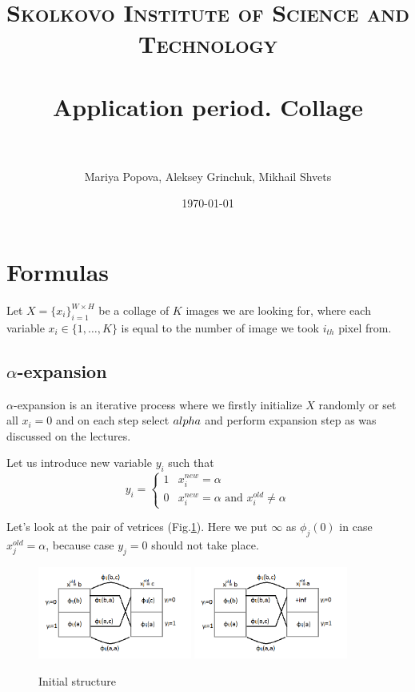 \documentclass[paper=a4, fontsize=11pt]{scrartcl} %
\title{	
\normalfont \normalsize
\textsc{Skolkovo Institute of Science and Technology} \\ [25pt] %
\horrule{0.5pt} \\[0.4cm] %
\huge Application period. Collage \\ %
\horrule{0.5pt} \\[0.5cm] %
}
\author{Mariya Popova, Aleksey Grinchuk, Mikhail Shvets} %
\date{\normalsize\today} %
\numberwithin{equation}{section} %
\numberwithin{figure}{section} %
\numberwithin{table}{section} %
\begin{document}
\maketitle %


\section{Formulas}

Let $X=\{x_i\}_{i=1}^{W \times H}$ be a collage of $K$ images we are looking for, where each variable $x_i \in \{1,\dots,K\}$ is equal to the number of image we took $i_{th}$ pixel from.

\subsection*{$\alpha$-expansion}

$\alpha$-expansion is an iterative process where we firstly initialize $X$ randomly or set all $x_i = 0$ and on each step select $\\alpha$ and perform expansion step as was discussed on the lectures.

Let us introduce new variable $y_i$ such that
$$y_i = \begin{cases}
1 & x_i^{new} = \alpha\\
0 & x_i^{new} = \alpha \text{ and } x_i^{old} \neq \alpha
\end{cases}$$

Let's look at the pair of vetrices (Fig.\ref{init_graph}). Here we put $\infty$ as $\phi_j(0)$ in case $x_j^{old} = \alpha$, because case $y_j = 0$ should not take place.

\begin{figure}[h!]
\begin{center}
\includegraphics[width=0.45\textwidth]{graph1.png}
\includegraphics[width=0.45\textwidth]{graph2.png}
\end{center}
\caption{Initial structure}
\label{init_graph}
\end{figure}
\end{document}
